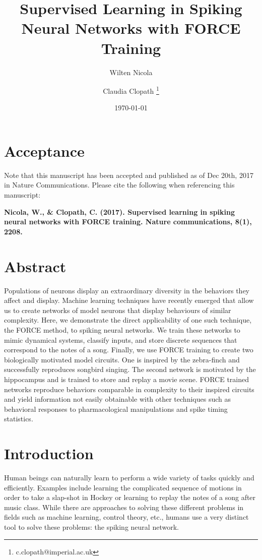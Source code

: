 \documentclass[11pt]{article} %
\title{Supervised Learning in Spiking Neural Networks with FORCE Training}
\date{\today} %
\author[1]{Wilten Nicola}
\author[1]{Claudia Clopath \thanks{c.clopath@imperial.ac.uk}}
\affil[1]{Department of Bioengineering, Imperial College London.  Royal School of Mines\\ London  UK\\  SW7 2AZ}
\begin{document}
\maketitle    


 \section*{Acceptance} Note that this manuscript has been accepted and published as of Dec 20th, 2017 in Nature Communications.  Please cite the following when referencing this manuscript: 


 \textbf{
Nicola, W., \& Clopath, C. (2017). Supervised learning in spiking neural networks with FORCE training. Nature communications, 8(1), 2208.}


\section*{Abstract}

Populations of neurons display an extraordinary diversity in the behaviors they affect and display. Machine learning techniques have recently emerged that allow us to create networks of model neurons that display behaviours of similar complexity. Here, we demonstrate the direct applicability of one such technique, the FORCE method, to spiking neural networks.  We train these networks to mimic dynamical systems, classify inputs, and store discrete sequences that correspond to the notes of a song. Finally, we use FORCE training to create two biologically motivated model circuits. One is inspired by the  zebra-finch and successfully reproduces songbird singing. The second network is motivated by the hippocampus and is trained to store and replay a movie scene.   FORCE trained networks reproduce behaviors comparable in complexity to their inspired circuits and yield information not easily obtainable with other techniques such as behavioral responses to pharmacological manipulations and spike timing statistics.  

\section*{Introduction}  

 Human beings can naturally learn to perform a wide variety of tasks  quickly and efficiently.  Examples include learning the complicated sequence of motions in order to take a slap-shot in Hockey or learning to replay the notes of a song after music class.   While there are approaches to solving these different problems in fields such as machine learning, control theory, etc., humans use a very distinct tool to solve these problems: the spiking neural network.  
\end{document}
